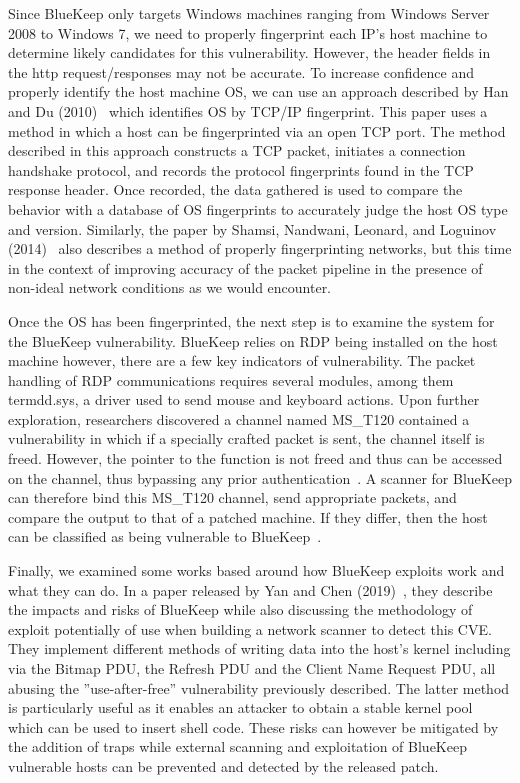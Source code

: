 Since BlueKeep only targets Windows machines ranging from Windows Server 2008 to Windows 7, we need to properly fingerprint each IP's host machine to determine likely candidates for this vulnerability. However, the header fields in the http request/responses may not be accurate. To increase confidence and properly identify the host machine OS, we can use an approach described by Han and Du (2010)~\cite{han_du_2010} which identifies OS by TCP/IP fingerprint. This paper uses a method in which a host can be fingerprinted via an open TCP port. The method described in this approach constructs a TCP packet, initiates a connection handshake protocol, and records the protocol fingerprints found in the TCP response header. Once recorded, the data gathered is used to compare the behavior with a database of OS fingerprints to accurately judge the host OS type and version. Similarly, the paper by Shamsi, Nandwani, Leonard, and Loguinov (2014)~\cite{zain_ankur_derek_log_2014} also describes a method of properly fingerprinting networks, but this time in the context of improving accuracy of the packet pipeline in the presence of non-ideal network conditions as we would encounter. 

Once the OS has been fingerprinted, the next step is to examine the system for the BlueKeep vulnerability. BlueKeep relies on RDP being installed on the host machine however, there are a few key indicators of vulnerability. The packet handling of RDP communications requires several modules, among them termdd.sys, a driver used to send mouse and keyboard actions. Upon further exploration, researchers discovered a channel named MS\_T120 contained a vulnerability in which if a specially crafted packet is sent, the channel itself is freed. However, the pointer to the function is not freed and thus can be accessed on the channel, thus bypassing any prior authentication~\cite{go_zingbox_com_2019}. A scanner for BlueKeep can therefore bind this MS\_T120 channel, send appropriate packets, and compare the output to that of a patched machine. If they differ, then the host can be classified as being vulnerable to BlueKeep~\cite{dillon_2019}.

Finally, we examined some works based around how BlueKeep exploits work and what they can do. In a paper released by Yan and Chen (2019)~\cite{yan_chen_2019}, they describe the impacts and risks of BlueKeep while also discussing the methodology of exploit potentially of use when building a network scanner to detect this CVE. They implement different methods of writing data into the host's kernel including via the Bitmap PDU, the Refresh PDU and the Client Name Request PDU, all abusing the ''use-after-free'' vulnerability previously described. The latter method is particularly useful as it enables an attacker to obtain a stable kernel pool which can be used to insert shell code. These risks can however be mitigated by the addition of traps while external scanning and exploitation of BlueKeep vulnerable hosts can be prevented and detected by the released patch.